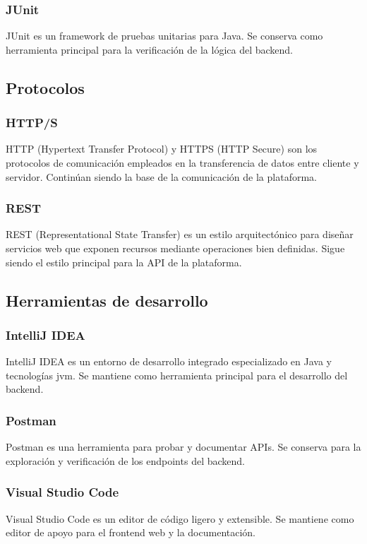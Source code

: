 \subsubsection{JUnit}
JUnit \cite{junit} es un framework de pruebas unitarias para Java. Se conserva como herramienta principal para la verificación de la lógica del backend.

\subsection{Protocolos}

\subsubsection{HTTP/S}
HTTP (Hypertext Transfer Protocol) y HTTPS (HTTP Secure) \cite{http} son los protocolos de comunicación empleados en la transferencia de datos entre cliente y servidor. Continúan siendo la base de la comunicación de la plataforma.

\subsubsection{REST}
REST (Representational State Transfer) \cite{rest} es un estilo arquitectónico para diseñar servicios web que exponen recursos mediante operaciones bien definidas. Sigue siendo el estilo principal para la API de la plataforma.

\subsection{Herramientas de desarrollo}

\subsubsection{IntelliJ IDEA}
IntelliJ IDEA \cite{intellij} es un entorno de desarrollo integrado especializado en Java y tecnologías \acrshort{jvm}. Se mantiene como herramienta principal para el desarrollo del backend.

\subsubsection{Postman}
Postman \cite{postman} es una herramienta para probar y documentar APIs. Se conserva para la exploración y verificación de los endpoints del backend.

\subsubsection{Visual Studio Code}
Visual Studio Code \cite{vscode} es un editor de código ligero y extensible. Se mantiene como editor de apoyo para el frontend web y la documentación.

